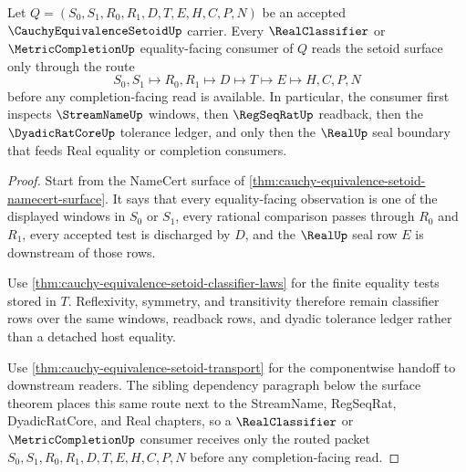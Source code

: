 \begin{theorem}
\label{thm:cauchy-equivalence-setoid-downstream-equality-dependency}
Let $Q=(S_0,S_1,R_0,R_1,D,T,E,H,C,P,N)$ be an accepted $\CauchyEquivalenceSetoidUp$ carrier. Every $\RealClassifier$ or $\MetricCompletionUp$ equality-facing consumer of $Q$ reads the setoid surface only through the route
$$
S_0,S_1 \longmapsto R_0,R_1 \longmapsto D \longmapsto T \longmapsto E \longmapsto H,C,P,N
$$
before any completion-facing read is available. In particular, the consumer first inspects $\StreamNameUp$ windows, then $\RegSeqRatUp$ readback, then the $\DyadicRatCoreUp$ tolerance ledger, and only then the $\RealUp$ seal boundary that feeds Real equality or completion consumers.
\end{theorem}
\begin{proof}
Start from the NameCert surface of \autoref{thm:cauchy-equivalence-setoid-namecert-surface}. It says that every equality-facing observation is one of the displayed windows in $S_0$ or $S_1$, every rational comparison passes through $R_0$ and $R_1$, every accepted test is discharged by $D$, and the $\RealUp$ seal row $E$ is downstream of those rows.

Use \autoref{thm:cauchy-equivalence-setoid-classifier-laws} for the finite equality tests stored in $T$. Reflexivity, symmetry, and transitivity therefore remain classifier rows over the same windows, readback rows, and dyadic tolerance ledger rather than a detached host equality.

Use \autoref{thm:cauchy-equivalence-setoid-transport} for the componentwise handoff to downstream readers. The sibling dependency paragraph below the surface theorem places this same route next to the StreamName, RegSeqRat, DyadicRatCore, and Real chapters, so a $\RealClassifier$ or $\MetricCompletionUp$ consumer receives only the routed packet $S_0,S_1,R_0,R_1,D,T,E,H,C,P,N$ before any completion-facing read.
\end{proof}


